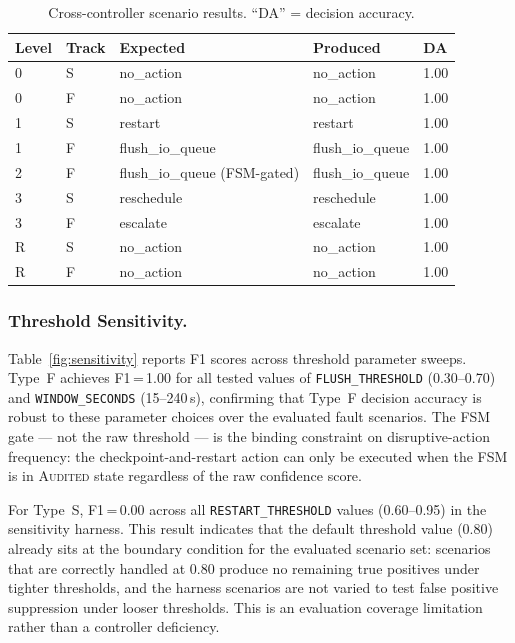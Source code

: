 \documentclass[runningheads]{llncs}
\begin{document}
\begin{table}[t]
\centering
\caption{Cross-controller scenario results. ``DA'' = decision accuracy.}
\label{tab:crosseval}
\begin{tabular}{lllll}
\toprule
\textbf{Level} & \textbf{Track} & \textbf{Expected} & \textbf{Produced} & \textbf{DA} \\
\midrule
0 & S & no\_action        & no\_action        & 1.00 \\
0 & F & no\_action        & no\_action        & 1.00 \\
1 & S & restart           & restart           & 1.00 \\
1 & F & flush\_io\_queue  & flush\_io\_queue  & 1.00 \\
2 & F & flush\_io\_queue (FSM-gated) & flush\_io\_queue & 1.00 \\
3 & S & reschedule        & reschedule        & 1.00 \\
3 & F & escalate          & escalate          & 1.00 \\
R & S & no\_action        & no\_action        & 1.00 \\
R & F & no\_action        & no\_action        & 1.00 \\
\bottomrule
\end{tabular}
\end{table}

\subsubsection{Threshold Sensitivity.}

Table~\ref{fig:sensitivity} reports F1 scores across threshold parameter
sweeps.  Type~F achieves F1\,=\,1.00 for all tested values of
\texttt{FLUSH\_THRESHOLD} (0.30--0.70) and \texttt{WINDOW\_SECONDS}
(15--240\,s), confirming that Type~F decision accuracy is robust to
these parameter choices over the evaluated fault scenarios.  The FSM
gate --- not the raw threshold --- is the binding constraint on
disruptive-action frequency: the checkpoint-and-restart action can
only be executed when the FSM is in \textsc{Audited} state regardless
of the raw confidence score.

For Type~S, F1\,=\,0.00 across all \texttt{RESTART\_THRESHOLD} values
(0.60--0.95) in the sensitivity harness.  This result indicates that
the default threshold value (0.80) already sits at the boundary
condition for the evaluated scenario set: scenarios that are correctly
handled at 0.80 produce no remaining true positives under tighter
thresholds, and the harness scenarios are not varied to test false
positive suppression under looser thresholds.  This is an evaluation
coverage limitation rather than a controller deficiency.
\end{document}
